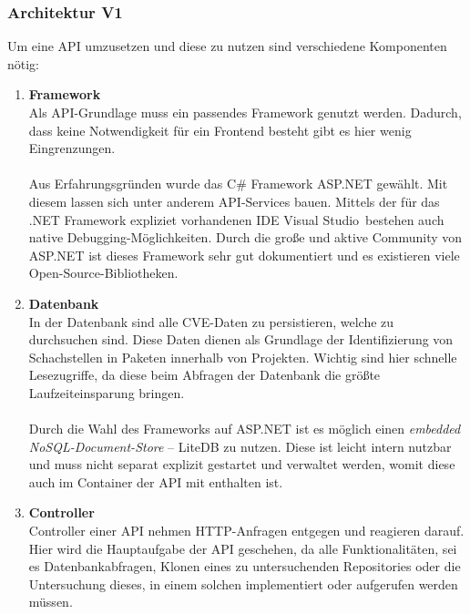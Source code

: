 \subsubsection{Architektur V1} \label{sec:Architektur}
    Um eine API umzusetzen und diese zu nutzen sind verschiedene Komponenten nötig:
    \begin{enumerate}
        \item \textbf{Framework} \label{arch_1}\\
            Als API-Grundlage muss ein passendes Framework genutzt werden.
            Dadurch, dass keine Notwendigkeit für ein Frontend besteht gibt es hier wenig Eingrenzungen.
            \\ \\
            Aus Erfahrungsgründen wurde das C\# Framework ASP.NET gewählt.
            Mit diesem lassen sich unter anderem API-Services bauen.
            Mittels der für das .NET Framework expliziet vorhandenen IDE \glqq Visual Studio\grqq~bestehen auch native Debugging-Möglichkeiten.
            Durch die große und aktive Community von ASP.NET ist dieses Framework sehr gut dokumentiert und es existieren viele Open-Source-Bibliotheken.
        \item \textbf{Datenbank} \label{arch_2}\\
            In der Datenbank sind alle CVE-Daten zu persistieren, welche zu durchsuchen sind.
            Diese Daten dienen als Grundlage der Identifizierung von Schachstellen in Paketen innerhalb von Projekten.
            Wichtig sind hier schnelle Lesezugriffe, da diese beim Abfragen der Datenbank die größte Laufzeiteinsparung bringen.
            \\ \\
            Durch die Wahl des Frameworks auf ASP.NET ist es möglich einen \textit{embedded NoSQL-Document-Store} -- LiteDB zu nutzen. %
            Diese ist leicht intern nutzbar und muss nicht separat explizit gestartet und verwaltet werden, womit diese auch im Container der API mit enthalten ist.
        \item \textbf{Controller} \label{arch_3}\\
            Controller einer API nehmen HTTP-Anfragen entgegen und reagieren darauf.
            Hier wird die Hauptaufgabe der API geschehen, da alle Funktionalitäten, sei es Datenbankabfragen, Klonen eines zu untersuchenden Repositories oder die Untersuchung dieses, in einem solchen implementiert oder aufgerufen werden müssen.
            \\ \\

\end{enumerate}
